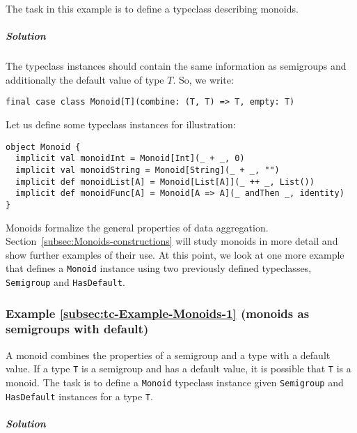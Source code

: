 The task in this example is to define a typeclass describing monoids. 

\subparagraph{Solution}

The typeclass instances should
contain the same information as semigroups and additionally the default
value of type $T$. So, we write:
\begin{lstlisting}
final case class Monoid[T](combine: (T, T) => T, empty: T)
\end{lstlisting}
Let us define some typeclass instances for illustration:
\begin{lstlisting}
object Monoid {
  implicit val monoidInt = Monoid[Int](_ + _, 0)
  implicit val monoidString = Monoid[String](_ + _, "")
  implicit def monoidList[A] = Monoid[List[A]](_ ++ _, List())
  implicit def monoidFunc[A] = Monoid[A => A](_ andThen _, identity)
}
\end{lstlisting}

Monoids formalize the general properties of data aggregation. Section~\ref{subsec:Monoids-constructions}
will study monoids in more detail and show further examples of their
use. At this point, we look at one more example that defines a \lstinline!Monoid!
instance using two previously defined typeclasses, \lstinline!Semigroup!
and \lstinline!HasDefault!.

\subsubsection{Example \label{subsec:tc-Example-Monoids-1}\ref{subsec:tc-Example-Monoids-1}
(monoids as semigroups with default)}

A monoid combines the properties of a semigroup and a type with a
default value. If a type \lstinline!T! is a semigroup and has a default
value, it is possible that \lstinline!T! is a monoid. The task is
to define a \lstinline!Monoid! typeclass instance given \lstinline!Semigroup!
and \lstinline!HasDefault! instances for a type \lstinline!T!.

\subparagraph{Solution}

